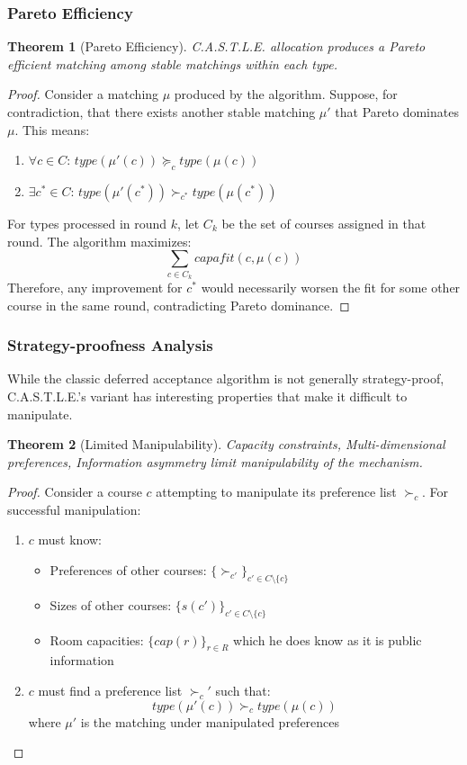 \documentclass[a4paper, oneside]{article}
\theoremstyle{plain}
\newtheorem{theorem}{Theorem}
\newcommand{\castle}{C{\small.}A{\small.}S{\small.}T{\small.}L{\small.}E{\small.}}
\begin{document}
\subsubsection{Pareto Efficiency}
\begin{theorem}[Pareto Efficiency]
\castle{} allocation produces a Pareto efficient matching among stable matchings within each type.
\end{theorem}

\begin{proof}
Consider a matching $\mu$ produced by the algorithm. Suppose, for contradiction, that there exists another stable matching $\mu'$ that Pareto dominates $\mu$.
This means:
\begin{enumerate}
    \item $\forall c \in C$: $type(\mu'(c)) \succeq_c type(\mu(c))$
    \item $\exists c^* \in C$: $type(\mu'(c^*)) \succ_{c^*} type(\mu(c^*))$
\end{enumerate}
For types processed in round $k$, let $C_k$ be the set of courses assigned in that round. The algorithm maximizes:
$$\sum_{c \in C_k} capafit(c, \mu(c))$$
Therefore, any improvement for $c^*$ would necessarily worsen the fit for some other course in the same round, contradicting Pareto dominance.
\end{proof}

\subsubsection{Strategy-proofness Analysis}

While the classic deferred acceptance algorithm is not generally strategy-proof, \castle{}'s variant has interesting properties that make it difficult to manipulate.
\begin{theorem}[Limited Manipulability]
Capacity constraints, Multi-dimensional preferences, Information asymmetry limit manipulability of the mechanism.
\end{theorem}

\begin{proof}
Consider a course $c$ attempting to manipulate its preference list $\succ_c$. For successful manipulation:
\begin{enumerate}
    \item $c$ must know:
        \begin{itemize}
            \item Preferences of other courses: $\{\succ_{c'}\}_{c' \in C\setminus\{c\}}$
            \item Sizes of other courses: $\{s(c')\}_{c' \in C\setminus\{c\}}$
            \item Room capacities: $\{cap(r)\}_{r \in R}$ which he does know as it is public information
        \end{itemize}
    \item $c$ must find a preference list $\succ_c'$ such that:
        $$type(\mu'(c)) \succ_c type(\mu(c))$$
        where $\mu'$ is the matching under manipulated preferences
\end{enumerate}
\end{proof}
\end{document}

